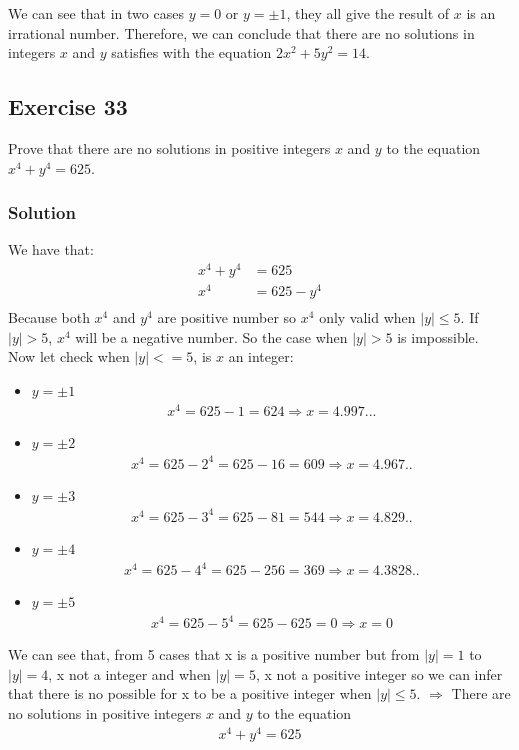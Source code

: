 \documentclass{article}
\begin{document}
We can see that in two cases $y = 0$ or $y = \pm 1$, they all give the result of $x$ is an irrational number. Therefore, we can conclude that there are no solutions in integers $x$ and $y$ satisfies with the equation $2x^2 + 5y^2 = 14$.
\subsection*{Exercise 33}
Prove that there are no solutions in positive integers $x$ and $y$ to the equation $x^4 + y^4 = 625$.
\subsubsection*{Solution}
We have that: 
\begin{align*}
    x^4 + y^4 &= 625\\
    x^4 &= 625 - y^4\\
\end{align*}
Because both $x^4$ and $y^4$ are positive number so $x^4$ only valid when $|y|\leq5$. If $|y|>5$, $x^4$ will be a negative number. So the case when $|y| > 5$ is impossible.\\
Now let check when $|y| <= 5$, is $x$ an integer:
\begin{itemize}
    \item $y = \pm 1$
        \begin{align*}
            x^4 = 625 - 1 = 624 \Rightarrow x = 4.997...
        \end{align*}
    \item $y = \pm 2$
        \begin{align*}
            x^4 = 625 - 2^4 = 625 - 16 = 609 \Rightarrow x =4.967..
        \end{align*}
    \item $y = \pm 3$
        \begin{align*}
            x^4 = 625 - 3^4 = 625 - 81 = 544 \Rightarrow x = 4.829..
        \end{align*}
    \item $y = \pm 4$
        \begin{align*}
            x^4 = 625 - 4^4 = 625 - 256 = 369 \Rightarrow x = 4.3828..
        \end{align*}
    \item $y = \pm 5$
        \begin{align*}
            x^4 = 625 -5^4 = 625 - 625 = 0 \Rightarrow x = 0
        \end{align*}
\end{itemize}
We can see that, from 5 cases that x is a positive number but from $|y| = 1$ to $|y| = 4$, x not a integer and when $|y| = 5$, x not a positive integer so we can infer that there is no possible for x to be a positive integer when $|y| \leq 5$.
$\Rightarrow$ There are no solutions in positive integers $x$ and $y$ to the equation
\begin{align*}
    x^4 + y^4 = 625
\end{align*}
\end{document}
